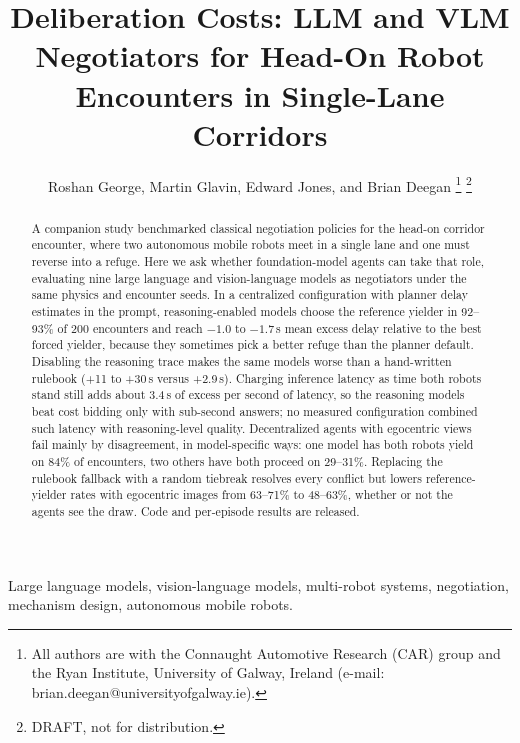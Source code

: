 \documentclass[journal]{IEEEtran}
\begin{document}
\title{Deliberation Costs: LLM and VLM Negotiators for Head-On Robot Encounters in Single-Lane Corridors}
\author{Roshan George, Martin Glavin, Edward Jones, and Brian Deegan%
\thanks{All authors are with the Connaught Automotive Research (CAR) group and the Ryan Institute, University of Galway, Ireland (e-mail: brian.deegan@universityofgalway.ie).}%
\thanks{DRAFT, not for distribution.}}
\maketitle

\begin{abstract}
A companion study benchmarked classical negotiation policies for the head-on corridor encounter, where two autonomous mobile robots meet in a single lane and one must reverse into a refuge. Here we ask whether foundation-model agents can take that role, evaluating nine large language and vision-language models as negotiators under the same physics and encounter seeds. In a centralized configuration with planner delay estimates in the prompt, reasoning-enabled models choose the reference yielder in 92--93\% of 200 encounters and reach $-1.0$ to $-1.7$\,s mean excess delay relative to the best forced yielder, because they sometimes pick a better refuge than the planner default. Disabling the reasoning trace makes the same models worse than a hand-written rulebook (+11 to +30\,s versus +2.9\,s). Charging inference latency as time both robots stand still adds about 3.4\,s of excess per second of latency, so the reasoning models beat cost bidding only with sub-second answers; no measured configuration combined such latency with reasoning-level quality. Decentralized agents with egocentric views fail mainly by disagreement, in model-specific ways: one model has both robots yield on 84\% of encounters, two others have both proceed on 29--31\%. Replacing the rulebook fallback with a random tiebreak resolves every conflict but lowers reference-yielder rates with egocentric images from 63--71\% to 48--63\%, whether or not the agents see the draw. Code and per-episode results are released.
\end{abstract}

\begin{IEEEkeywords}
Large language models, vision-language models, multi-robot systems, negotiation,
mechanism design, autonomous mobile robots.
\end{IEEEkeywords}
\end{document}
